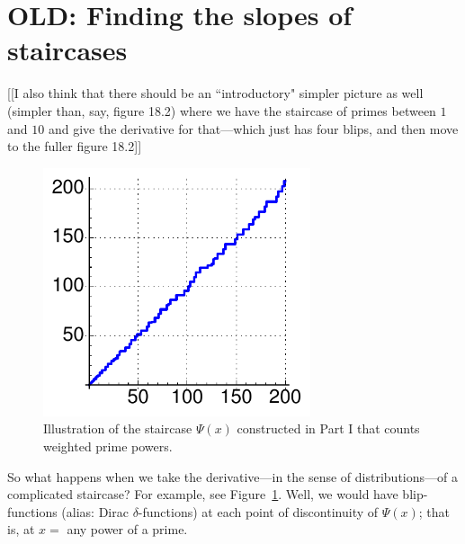 \documentclass[11pt]{article}
\theoremstyle{plain}
\theoremstyle{definition}
\numberwithin{equation}{section}
\numberwithin{figure}{section}
\numberwithin{table}{section}
\begin{document}
   



\section{OLD: Finding the slopes of staircases} 

[[I also think that there should be an ``introductory" simpler picture
as well (simpler than, say, figure 18.2) where we have the staircase
of primes between $1$ and $10$ and give the derivative for
that---which just has four blips, and then move to the fuller figure
18.2]]

\begin{figure}[H]
\begin{center}
\includegraphics[width=0.7\textwidth]{illustrations/psi_200}
\caption{Illustration of the  staircase $\Psi(x)$  constructed in Part I that 
counts weighted prime powers.\label{fig:psi_200}}
\end{center}
\end{figure}
  
So what happens when we take the derivative---in the sense of
distributions---of a complicated staircase?  For example, see
Figure~\ref{fig:psi_200}.  Well, we would have blip-functions (alias:
Dirac $\delta$-functions) at each point of discontinuity of $\Psi(x)$;
that is, at $x=$ any power of a prime.
  
     \bigskip
   
\end{document}
